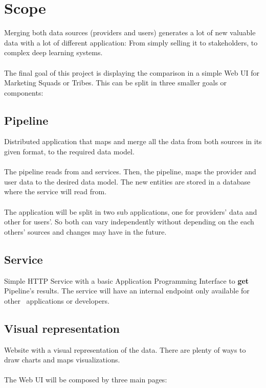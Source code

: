 
\section{Scope}

Merging both data sources (providers and users) generates a lot of new valuable data with a lot of different application: From simply selling it to stakeholders, to complex deep learning systems.
\\\\
The final goal of this project is displaying the comparison in a simple Web UI for Marketing Squads or Tribes. This can be split in three smaller goals or components:

\subsection{Pipeline}

Distributed application that maps and merge all the data from both sources in its given format, to the required data model.
\\\\
The pipeline reads from  and  services. Then, the pipeline, maps the provider and user data to the desired data model. The new entities are stored in a database where the service will read from.
\\\\
The application will be split in two sub applications, one for providers' data and other for users'. So both can vary independently without depending on the each others' sources and changes may have in the future.

\subsection{Service}

Simple HTTP Service with a basic Application Programming Interface to \textbf{get} Pipeline's results. The service will have an internal endpoint only available for other \company\ applications or developers.

\subsection{Visual representation} \label{visual_representation}

Website with a visual representation of the data. There are plenty of ways to draw charts and maps visualizations.
\\\\
The Web UI will be composed by three main pages:


